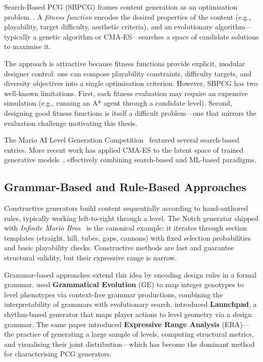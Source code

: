 \documentclass[shortabstract, mgr, english]{iithesis}
\begin{document}
Search-Based PCG (SBPCG) frames content generation as an optimisation
problem~\citep{togelius2011search}. A \emph{fitness function} encodes the desired
properties of the content (e.g., playability, target difficulty, aesthetic
criteria), and an evolutionary algorithm---typically a genetic algorithm or
CMA-ES---searches a space of candidate solutions to maximise it.

The approach is attractive because fitness functions provide explicit, modular
designer control: one can compose playability constraints, difficulty targets,
and diversity objectives into a single optimisation criterion. However, SBPCG has
two well-known limitations. First, each fitness evaluation may require an
expensive simulation (e.g., running an A* agent through a candidate level).
Second, designing good fitness functions is itself a difficult problem---one that
mirrors the evaluation challenge motivating this thesis.

The Mario AI Level Generation Competition~\citep{shaker2011mario} featured
several search-based entries. More recent work has applied CMA-ES to the latent
space of trained generative models~\citep{volz2018evolving}, effectively combining
search-based and ML-based paradigms.

\subsection{Grammar-Based and Rule-Based Approaches}
\label{subsec:bg-grammar}

Constructive generators build content sequentially according to hand-authored
rules, typically working left-to-right through a level. The Notch generator
shipped with \emph{Infinite Mario
Bros}~\citep{karakovskiy2012marioai} is the canonical example: it iterates
through section templates (straight, hill, tubes, gaps, cannons) with fixed
selection probabilities and basic playability checks. Constructive methods are
fast and guarantee structural validity, but their expressive range is narrow.

Grammar-based approaches extend this idea by encoding design rules in a formal
grammar. \citet{shaker2012evolving} used \textbf{Grammatical Evolution} (GE) to
map integer genotypes to level phenotypes via context-free grammar productions,
combining the interpretability of grammars with evolutionary search.
\citet{smith2010analyzing} introduced \textbf{Launchpad}, a rhythm-based
generator that maps player actions to level geometry via a design grammar. The
same paper introduced \textbf{Expressive Range Analysis} (ERA)---the practice of
generating a large sample of levels, computing structural metrics, and
visualising their joint distribution---which has become the dominant method for
characterising PCG generators.
\end{document}
